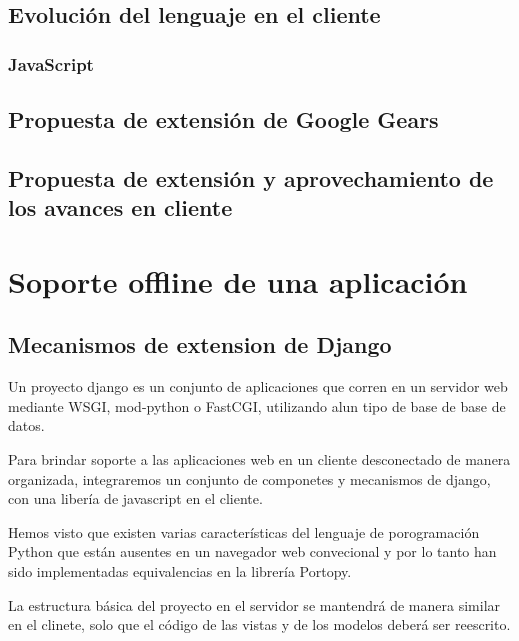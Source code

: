 \documentclass[a4paper]{report}
\begin{document}
\section{Evolución del lenguaje en el cliente}
\subsection{JavaScript}

\section{Propuesta de extensión de Google Gears}
\section{Propuesta de extensión y aprovechamiento de los avances en cliente}





\chapter{Soporte offline de una aplicación}
\section{Mecanismos de extension de Django}

Un proyecto django es un conjunto de aplicaciones que corren en un servidor
web mediante WSGI, mod-python o FastCGI, utilizando alun tipo de base de 
base de datos.



Para brindar soporte a las aplicaciones web en un cliente desconectado de 
manera organizada, integraremos un conjunto de componetes y mecanismos
de django, con una libería de javascript en el cliente.

Hemos visto que existen varias características del lenguaje de porogramación
Python que están ausentes en un navegador web convecional y por lo tanto
han sido implementadas equivalencias en la librería Portopy.


La estructura básica del proyecto en el servidor se mantendrá de manera similar
en el clinete, solo que el código de las vistas y de los modelos deberá ser
reescrito.
\end{document}
